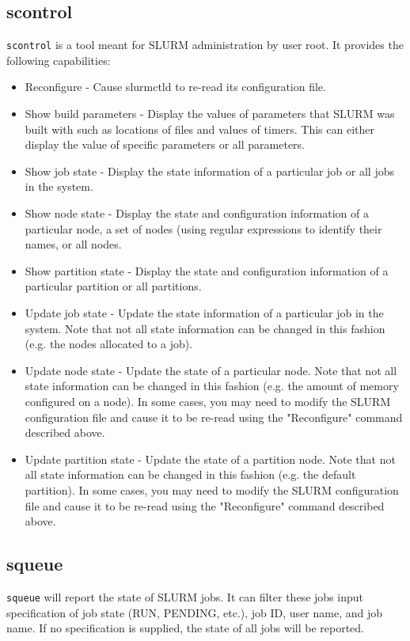 \subsection{scontrol}

{\tt scontrol} is a tool meant for SLURM administration by user root. 
It provides the following capabilities:
\begin{itemize}
\item Reconfigure - Cause slurmctld to re-read its configuration file.
\item Show build parameters - Display the values of parameters that SLURM 
was built with such as locations of files and values of timers. This can 
either display the value of specific parameters or all parameters.
\item Show job state - Display the state information of a particular job 
or all jobs in the system.
\item Show node state - Display the state and configuration information 
of a particular node, a set of nodes (using regular expressions to 
identify their names, or all nodes.
\item Show partition state - Display the state and configuration information 
of a particular partition or all partitions.
\item Update job state - Update the state information of a particular job 
in the system. Note that not all state information can be changed in this 
fashion (e.g. the nodes allocated to a job).
\item Update node state - Update the state of a particular node. Note that 
not all state information can be changed in this fashion (e.g. the amount 
of memory configured on a node). In some cases, you may need to modify 
the SLURM configuration file and cause it to be re-read using the "Reconfigure" 
command described above.
\item Update partition state - Update the state of a partition node. Note that 
not all state information can be changed in this fashion (e.g. the default 
partition). In some cases, you may need to modify the SLURM configuration 
file and cause it to be re-read using the "Reconfigure" command described above.
\end{itemize}

\subsection{squeue}

{\tt squeue} will report the state of SLURM jobs.  It can filter these
jobs input specification of job state (RUN, PENDING, etc.), job ID,
user name, and job name.  If no specification is supplied, the state of
all jobs will be reported.

